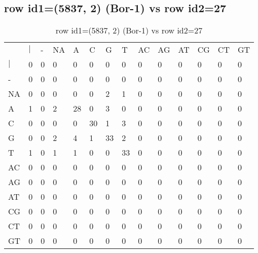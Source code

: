 \subsection{row id1=(5837, 2) (Bor-1) vs row id2=27}
\begin{center}
\begin{longtable}{|l|l|l|l|l|l|l|l|l|l|l|l|l|l|}
\caption{row id1=(5837, 2) (Bor-1) vs row id2=27} \label{table_dm4}\\
\hline
\\
\hline
&$|$&-&NA&A&C&G&T&AC&AG&AT&CG&CT&GT\\
$|$&0&0&0&0&0&0&0&0&0&0&0&0&0\\
-&0&0&0&0&0&0&0&0&0&0&0&0&0\\
NA&0&0&0&0&0&2&1&0&0&0&0&0&0\\
A&1&0&2&28&0&3&0&0&0&0&0&0&0\\
C&0&0&0&0&30&1&3&0&0&0&0&0&0\\
G&0&0&2&4&1&33&2&0&0&0&0&0&0\\
T&1&0&1&1&0&0&33&0&0&0&0&0&0\\
AC&0&0&0&0&0&0&0&0&0&0&0&0&0\\
AG&0&0&0&0&0&0&0&0&0&0&0&0&0\\
AT&0&0&0&0&0&0&0&0&0&0&0&0&0\\
CG&0&0&0&0&0&0&0&0&0&0&0&0&0\\
CT&0&0&0&0&0&0&0&0&0&0&0&0&0\\
GT&0&0&0&0&0&0&0&0&0&0&0&0&0\\
\hline
\end{longtable}
\end{center}

